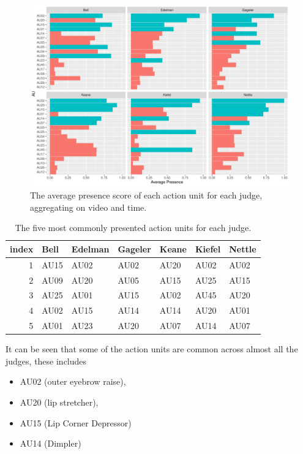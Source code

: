 \documentclass{monashthesis}
\begin{document}
\begin{figure}

{\centering \includegraphics[width=1\linewidth]{figures/most-common-1} 

}

\caption{The average presence score of each action unit for each judge, aggregating on video and time. \label{fig:mean_presence}}\label{fig:most-common}
\end{figure}

\begin{table}

\caption{\label{tab:most-common-table}\label{tab:most_common}The five most commonly presented action units for each judge.}
\centering
\begin{tabular}[t]{r|l|l|l|l|l|l}
\hline
index & Bell & Edelman & Gageler & Keane & Kiefel & Nettle\\
\hline
1 & AU15 & AU02 & AU02 & AU20 & AU02 & AU02\\
\hline
2 & AU09 & AU20 & AU05 & AU15 & AU25 & AU15\\
\hline
3 & AU25 & AU01 & AU15 & AU02 & AU45 & AU20\\
\hline
4 & AU02 & AU15 & AU14 & AU14 & AU20 & AU01\\
\hline
5 & AU01 & AU23 & AU20 & AU07 & AU14 & AU07\\
\hline
\end{tabular}
\end{table}

It can be seen that some of the action units are common across almost all the judges, these includes

\begin{itemize}
\tightlist
\item
  AU02 (outer eyebrow raise),
\item
  AU20 (lip stretcher),
\item
  AU15 (Lip Corner Depressor)
\item
  AU14 (Dimpler)
\end{itemize}
\end{document}
